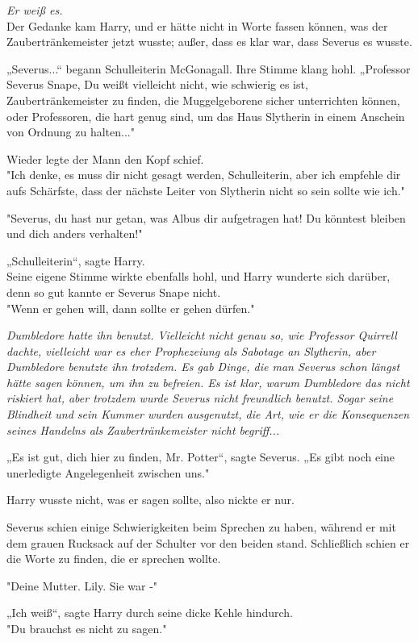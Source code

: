 {\emph{Er weiß es.}\\ Der Gedanke kam Harry, und er hätte nicht in Worte fassen können, was der Zaubertränkemeister jetzt wusste; außer, dass es klar war, dass Severus es wusste.

„Severus...“ begann Schulleiterin McGonagall. Ihre Stimme klang hohl. „Professor Severus Snape, Du weißt vielleicht nicht, wie schwierig es ist, Zaubertränkemeister zu finden, die Muggelgeborene sicher unterrichten können, oder Professoren, die hart genug sind, um das Haus Slytherin in einem Anschein von Ordnung zu halten..."

Wieder legte der Mann den Kopf schief.\\ "Ich denke, es muss dir nicht gesagt werden, Schulleiterin, aber ich empfehle dir aufs Schärfste, dass der nächste Leiter von Slytherin nicht so sein sollte wie ich."

"Severus, du hast nur getan, was Albus dir aufgetragen hat! Du könntest bleiben und dich anders verhalten!"

„Schulleiterin“, sagte Harry.\\ Seine eigene Stimme wirkte ebenfalls hohl, und Harry wunderte sich darüber, denn so gut kannte er Severus Snape nicht.\\ "Wenn er gehen will, dann sollte er gehen dürfen."

\emph{Dumbledore hatte ihn benutzt. Vielleicht nicht genau so, wie Professor Quirrell dachte, vielleicht war es eher Prophezeiung als Sabotage an Slytherin, aber Dumbledore benutzte ihn trotzdem. Es gab Dinge, die man Severus schon längst hätte sagen können, um ihn zu befreien. Es ist klar, warum Dumbledore das nicht riskiert hat, aber trotzdem wurde Severus nicht freundlich benutzt. Sogar seine Blindheit und sein Kummer wurden ausgenutzt, die Art, wie er die Konsequenzen seines Handelns als Zaubertränkemeister nicht begriff...}

„Es ist gut, dich hier zu finden, Mr. Potter“, sagte Severus. „Es gibt noch eine unerledigte Angelegenheit zwischen uns."

Harry wusste nicht, was er sagen sollte, also nickte er nur.

Severus schien einige Schwierigkeiten beim Sprechen zu haben, während er mit dem grauen Rucksack auf der Schulter vor den beiden stand. Schließlich schien er die Worte zu finden, die er sprechen wollte.

"Deine Mutter. Lily. Sie war -"

„Ich weiß“, sagte Harry durch seine dicke Kehle hindurch.\\ "Du brauchst es nicht zu sagen."

}
